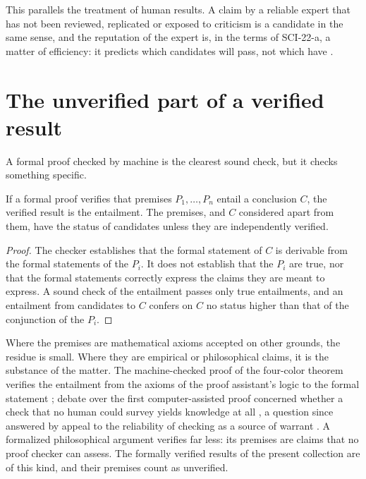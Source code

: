 \documentclass{situationist-preprint}
\begin{document}
This parallels the treatment of human results. A claim by a reliable expert that has not been reviewed, replicated or exposed to criticism is a candidate in the same sense, and the reputation of the expert is, in the terms of SCI-22-a, a matter of efficiency: it predicts which candidates will pass, not which have \citep{Longino1990}.

\section{The unverified part of a verified result}

A formal proof checked by machine is the clearest sound check, but it checks something specific.

\begin{proposition}\label{p:premises}
If a formal proof verifies that premises $P_1,\dots,P_n$ entail a conclusion $C$, the verified result is the entailment. The premises, and $C$ considered apart from them, have the status of candidates unless they are independently verified.
\end{proposition}

\begin{proof}
The checker establishes that the formal statement of $C$ is derivable from the formal statements of the $P_i$. It does not establish that the $P_i$ are true, nor that the formal statements correctly express the claims they are meant to express. A sound check of the entailment passes only true entailments, and an entailment from candidates to $C$ confers on $C$ no status higher than that of the conjunction of the $P_i$.
\end{proof}

Where the premises are mathematical axioms accepted on other grounds, the residue is small. Where they are empirical or philosophical claims, it is the substance of the matter. The machine-checked proof of the four-color theorem verifies the entailment from the axioms of the proof assistant's logic to the formal statement \citep{Gonthier2008}; debate over the first computer-assisted proof concerned whether a check that no human could survey yields knowledge at all \citep{Tymoczko1979}, a question since answered by appeal to the reliability of checking as a source of warrant \citep{Burge1998}. A formalized philosophical argument verifies far less: its premises are claims that no proof checker can assess. The formally verified results of the present collection are of this kind, and their premises count as unverified.
\end{document}
